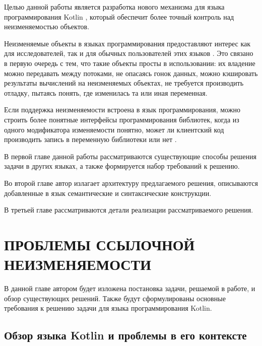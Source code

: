\documentclass[specification,annotation,times]{itmo-student-thesis}
\begin{document}

Целью данной работы является разработка нового механизма для языка программирования Kotlin \cite{kotlin}, который обеспечит более точный контроль над неизменяемостью объектов.

Неизменяемые объекты в языках программирования предоставляют интерес как для исследователей, так и для обычных пользователей этих языков \cite{effective-java}.
Это связано в первую очередь с тем, что такие объекты просты в использовании: их
владение можно передавать между потоками, не опасаясь гонок данных, можно кэшировать результаты вычислений на неизменяемых объектах,
не требуется производить отладку, пытаясь понять, где изменилась та или иная переменная.

Если поддержка неизменяемости встроена в язык программирования, можно строить более понятные интерфейсы программирования библиотек,
когда из одного модификатора изменяемости понятно, может ли клиентский код производить запись в переменную библиотеки или нет \cite{javari}.

В первой главе данной работы рассматриваются существующие способы решения задачи в других языках, а также формируется набор требований к решению.

Во второй главе автор излагает архитектуру предлагаемого решения, описываются добавленные в язык семантические и синтаксические конструкции.

В третьей главе рассматриваются детали реализации рассматриваемого решения.


\chapter{ПРОБЛЕМЫ ССЫЛОЧНОЙ НЕИЗМЕНЯЕМОСТИ}

В данной главе автором будет изложена постановка задачи, решаемой в работе, и обзор существующих решений.
Также будут сформулированы основные требования к решению задачи для языка программирования Kotlin.

\section{Обзор языка Kotlin и проблемы в его контексте}\label{existing_kotlin}
\end{document}
